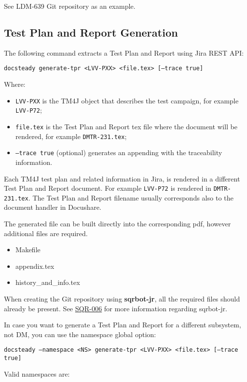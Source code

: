 \documentclass[DM]{lsstdoc}
\begin{document}
See LDM-639 Git repository as an example.


\subsection{Test Plan and Report Generation}

The following command extracts a Test Plan and Report using Jira REST API:

\texttt{docsteady generate-tpr <LVV-PXX> <file.tex> [--trace true]}

Where:

\begin{itemize}
\item \texttt{LVV-PXX} is the TM4J object that describes the test campaign, for example \texttt{LVV-P72};
\item \texttt{file.tex} is the Test Plan and Report tex file where the document will be rendered, for example \texttt{DMTR-231.tex};
\item \texttt{--trace true} (optional) generates an appending with the traceability information.
\end{itemize}

Each TM4J test plan and related information in Jira, is rendered in a different Test Plan and Report document.
For example \texttt{LVV-P72} is rendered in \texttt{DMTR-231.tex}.
The Test Plan and Report filename usually corresponds also to the document handler in Docushare.

The generated file can be built directly into the corresponding pdf, however additional files are required.

\begin{itemize}
\item Makefile
\item appendix.tex
\item history\_and\_info.tex
\end{itemize}

When creating the Git repository using \textbf{sqrbot-jr}, all the required files should already be present.
See \href{https://sqr-006.lsst.io/}{SQR-006} for more information regarding sqrbot-jr.

In case you want to generate a Test Plan and Report for a different subsystem, not DM, you can use the namespace global option:

\texttt{docsteady --namespace <NS> generate-tpr <LVV-PXX> <file.tex> [--trace true]}

Valid namespaces are:
\end{document}

